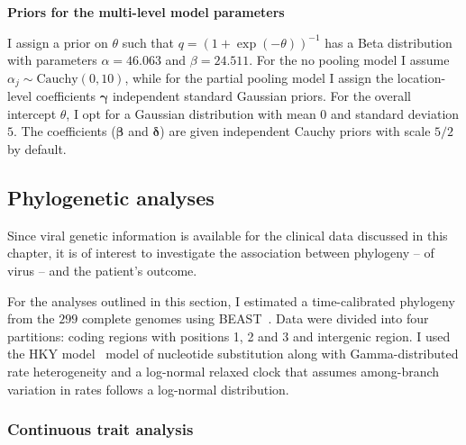 \textbf{Priors for the multi-level model parameters}

I assign a prior on $\theta$ such that $q = (1 + \exp(-\theta))^{-1}$ has a Beta distribution with parameters $\alpha = 46.063$ and $\beta = 24.511$.
For the no pooling model I assume $\alpha_j\sim \text{Cauchy}(0, 10)$, while for the partial pooling model I assign the location-level coefficients $\boldsymbol \gamma$ independent standard Gaussian priors.
For the overall intercept $\theta$, I opt for a Gaussian distribution with mean $0$ and standard deviation $5$.
The coefficients ($\boldsymbol\beta$ and $\boldsymbol\delta$) are given independent Cauchy priors with scale $5/2$ by default.

\subsection{Phylogenetic analyses}

Since viral genetic information is available for the clinical data discussed in this chapter, it is of interest to investigate the association between phylogeny -- of virus -- and the patient's outcome.

For the analyses outlined in this section, I estimated a time-calibrated phylogeny from the $299$ complete genomes using BEAST~\citep{Drummond2012}.
Data were divided into four partitions: coding regions with positions 1, 2 and 3 and intergenic region.
I used the HKY model~\citep{Hasegawa1985} model of nucleotide substitution along with Gamma-distributed rate heterogeneity and a log-normal relaxed clock that assumes among-branch variation in rates follows a log-normal distribution.

\subsubsection{Continuous trait analysis}
\label{sec:cta}

